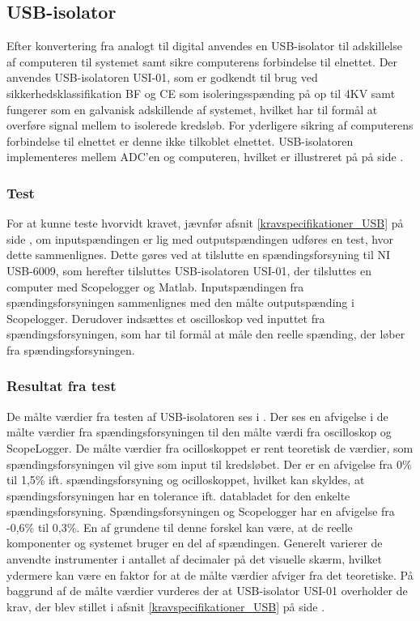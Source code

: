 \subsection{USB-isolator}
Efter konvertering fra analogt til digital anvendes en USB-isolator til adskillelse af computeren til systemet samt sikre computerens forbindelse til elnettet. 
Der anvendes USB-isolatoren USI-01, som er godkendt til brug ved sikkerhedsklassifikation BF og CE som isoleringsspænding på op til 4KV samt fungerer som en galvanisk adskillende af systemet, hvilket har til formål at overføre signal mellem to isolerede kredsløb. For yderligere sikring af computerens forbindelse til elnettet er denne ikke tilkoblet elnettet. USB-isolatoren implementeres mellem ADC'en og computeren, hvilket er illustreret på  på side \pageref{blokdiagram}.

\subsubsection{Test}
For at kunne teste hvorvidt kravet, jævnfør afsnit \ref{kravspecifikationer_USB} på side \pageref{kravspecifikationer_USB}, om inputspændingen er lig med outputspændingen udføres en test, hvor dette sammenlignes. Dette gøres ved at tilslutte en spændingsforsyning til NI USB-6009, som herefter tilsluttes USB-isolatoren USI-01, der tilsluttes en computer med Scopelogger og Matlab. Inputspændingen fra spændingsforsyningen sammenlignes med den målte outputspænding i Scopelogger. Derudover indsættes et oscilloskop ved inputtet fra spændingsforsyningen, som har til formål at måle den reelle spænding, der løber fra spændingsforsyningen. 

\subsubsection{Resultat fra test}
De målte værdier fra testen af USB-isolatoren ses i . Der ses en afvigelse i de målte værdier fra spændingsforsyningen til den målte værdi fra oscilloskop og ScopeLogger. De målte værdier fra ocilloskoppet er rent teoretisk de værdier, som spændingsforsyningen vil give som input til kredsløbet. Der er en afvigelse fra 0\% til 1,5\% ift. spændingsforsyning og ocilloskoppet, hvilket kan skyldes, at spændingsforsyningen har en tolerance ift. databladet for den enkelte spændingsforsyning. Spændingsforsyningen og Scopelogger har en afvigelse fra -0,6\% til 0,3\%. En af grundene til denne forskel kan være, at de reelle komponenter og systemet bruger en del af spændingen. Generelt varierer de anvendte instrumenter i antallet af decimaler på det visuelle skærm, hvilket ydermere kan være en faktor for at de målte værdier afviger fra det teoretiske. På baggrund af de målte værdier vurderes der at USB-isolator USI-01 overholder de krav, der blev stillet i afsnit \ref{kravspecifikationer_USB} på side \pageref{kravspecifikationer_USB}.


